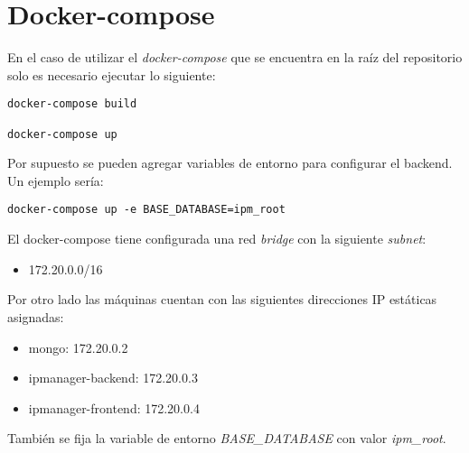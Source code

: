 \section{Docker-compose}

En el caso de utilizar el \textit{docker-compose} que se encuentra en la raíz del repositorio solo es necesario ejecutar lo siguiente:

\begin{lstlisting}
docker-compose build

docker-compose up
\end{lstlisting}

Por supuesto se pueden agregar variables de entorno para configurar el backend. Un ejemplo sería:

\begin{lstlisting}
docker-compose up -e BASE_DATABASE=ipm_root
\end{lstlisting}

El docker-compose tiene configurada una red \textit{bridge} con la siguiente \textit{subnet}:

\begin{itemize}
	\item 172.20.0.0/16
\end{itemize}

Por otro lado las máquinas cuentan con las siguientes direcciones IP estáticas asignadas:

\begin{itemize}
	\item mongo: 172.20.0.2
	\item ipmanager-backend: 172.20.0.3
	\item ipmanager-frontend: 172.20.0.4
\end{itemize}

También se fija la variable de entorno \textit{BASE\_DATABASE} con valor \textit{ipm\_root}.